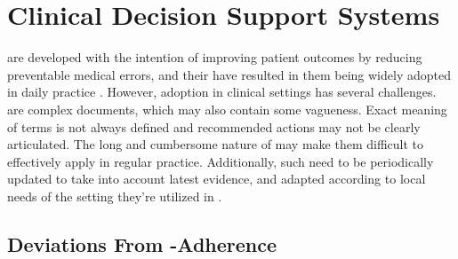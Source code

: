 
\section{Clinical Decision Support Systems}\label{sec:cdss-background}


\BPGs{} are developed with the intention of improving patient outcomes
by reducing preventable medical errors, and their
have resulted in them being widely adopted
in daily practice \cite{WoolfBMJ99}. However, \BPG{} adoption in
clinical settings has several challenges. \BPGs{} are complex documents,
which may also contain some vagueness.
Exact meaning of terms is not always defined and recommended
actions may not be clearly articulated. The long and cumbersome
nature of \BPGs{} may make them difficult to effectively apply
in regular practice. Additionally, such \BPGs{} need to be
periodically updated to take into account latest evidence, and
adapted according to local needs of the setting they're utilized
in \cite{DeClerqSHTI08}.

\subsection{Deviations From \BPG{}-Adherence}

